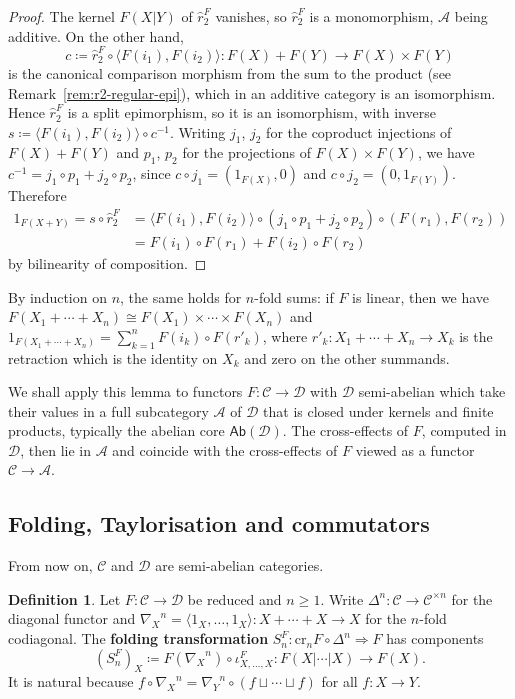 \documentclass[reqno,a4paper]{amsart}
\theoremstyle{plain}
\theoremstyle{definition}
\newtheorem{definition}[subsection]{Definition}
\newcommand{\defn}{\textbf}
\newcommand{\DefEq}{\coloneq}
\newcommand{\C}{\ensuremath{\mathcal{C}}}
\newcommand{\D}{\ensuremath{\mathcal{D}}}
\newcommand{\A}{\ensuremath{\mathcal{A}}}
\newcommand{\Ab}{\ensuremath{\mathsf{Ab}}}
\newcommand{\cre}{\ensuremath{\mathrm{cr}}}
\newcommand{\cosum}{\ensuremath{\sqcup}}                   %
\newcommand{\cmF}[2]{\ensuremath{\hat{r}^{#1}_{#2}}}       %
\newcommand{\fold}[1]{\ensuremath{\nabla_{#1}}}            %
\begin{document}
\begin{proof}
  The kernel \(F(X|Y)\) of \(\cmF{F}{2}\) vanishes, so \(\cmF{F}{2}\) is a monomorphism, \(\A\) being additive. On the other hand,
  \[
    c\DefEq\cmF{F}{2}\circ\langle F(i_{1}),F(i_{2})\rangle\colon F(X)+F(Y)\to F(X)\times F(Y)
  \]
  is the canonical comparison morphism from the sum to the product (see Remark~\ref{rem:r2-regular-epi}), which in an additive category is an isomorphism. Hence \(\cmF{F}{2}\) is a split epimorphism, so it is an isomorphism, with inverse \(s\DefEq\langle F(i_{1}),F(i_{2})\rangle\circ c^{-1}\). Writing \(j_{1}\), \(j_{2}\) for the coproduct injections of \(F(X)+F(Y)\) and \(p_{1}\), \(p_{2}\) for the projections of \(F(X)\times F(Y)\), we have \(c^{-1}=j_{1}\circ p_{1}+j_{2}\circ p_{2}\), since \(c\circ j_{1}=(1_{F(X)},0)\) and \(c\circ j_{2}=(0,1_{F(Y)})\). Therefore
  \begin{align*}
    1_{F(X+Y)}=s\circ\cmF{F}{2} & =\langle F(i_{1}),F(i_{2})\rangle\circ(j_{1}\circ p_{1}+j_{2}\circ p_{2})\circ(F(r_{1}),F(r_{2})) \\
                                & =F(i_{1})\circ F(r_{1})+F(i_{2})\circ F(r_{2})
  \end{align*}
  by bilinearity of composition.
\end{proof}

By induction on \(n\), the same holds for \(n\)-fold sums: if \(F\) is linear, then we have \(F(X_{1}+\cdots+X_{n})\cong F(X_{1})\times\cdots\times F(X_{n})\) and \(1_{F(X_{1}+\cdots+X_{n})}=\sum_{k=1}^{n}F(i_{k})\circ F(r'_{k})\), where \(r'_{k}\colon X_{1}+\cdots+X_{n}\to X_{k}\) is the retraction which is the identity on \(X_{k}\) and zero on the other summands.

We shall apply this lemma to functors \(F\colon \C\to\D\) with \(\D\) semi-abelian which take their values in a full subcategory \(\A\) of \(\D\) that is closed under kernels and finite products, typically the abelian core \(\Ab(\D)\). The cross-effects of \(F\), computed in \(\D\), then lie in \(\A\) and coincide with the cross-effects of \(F\) viewed as a functor \(\C\to\A\).

\subsection{Folding, Taylorisation and commutators}\label{sec:folding}
From now on, \(\C\) and \(\D\) are semi-abelian categories.

\begin{definition}\label{def:folding}
  Let \(F\colon \C\to\D\) be reduced and \(n\geq 1\). Write \(\Delta^{n}\colon \C\to\C^{\times n}\) for the diagonal functor and \(\fold{X}^{n}=\langle 1_{X},\dots,1_{X}\rangle\colon X+\cdots+X\to X\) for the \(n\)-fold codiagonal. The \defn{folding transformation} \(S^{F}_{n}\colon \cre_{n}F\circ\Delta^{n}\Rightarrow F\) has components
  \[
    (S^{F}_{n})_{X}\DefEq F(\fold{X}^{n})\circ\iota^{F}_{X,\dots,X}\colon F(X|\cdots|X)\to F(X)\text{.}
  \]
  It is natural because \(f\circ\fold{X}^{n}=\fold{Y}^{n}\circ(f\cosum\cdots\cosum f)\) for all \(f\colon X\to Y\).
\end{definition}
\end{document}

